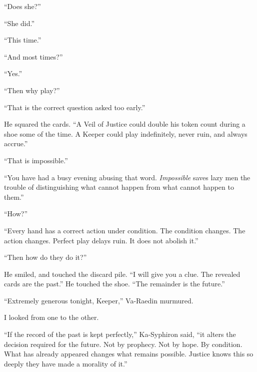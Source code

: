 ``Does she?''\par

``She did.''\par

``This time.''\par

``And most times?''\par

``Yes.''\par

``Then why play?''\par

``That is the correct question asked too early.''\par

He squared the cards. ``A Veil of Justice could double his token count during a shoe some of the time. A Keeper could play indefinitely, never ruin, and always accrue.''\par

``That is impossible.''\par

``You have had a busy evening abusing that word. \emph{Impossible} saves lazy men the trouble of distinguishing what cannot happen from what cannot happen to them.''\par

``How?''\par

``Every hand has a correct action under condition. The condition changes. The action changes. Perfect play delays ruin. It does not abolish it.''\par

``Then how do they do it?''\par

He smiled, and touched the discard pile. ``I will give you a clue. The revealed cards are the past.''
He touched the shoe. ``The remainder is the future.''\par

``Extremely generous tonight, Keeper,'' Va-Raedin murmured.\par

I looked from one to the other.\par

``If the record of the past is kept perfectly,'' Ka-Syphiron said, ``it alters the decision required for the future. Not by prophecy. Not by hope. By condition. What has already appeared changes what remains possible. Justice knows this so deeply they have made a morality of it.''\par

